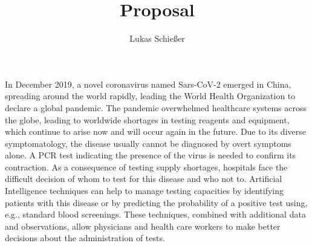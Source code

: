 \documentclass[12pt,a4paper,oneside]{article}
\title{Proposal}
\author{Lukas Schießer}
\date{}
\begin{document}
\maketitle
In December 2019, a novel coronavirus named Sars-CoV-2 emerged in China, spreading around the world rapidly, leading the World Health Organization to declare a global pandemic. The pandemic overwhelmed healthcare systems across the globe, leading to worldwide shortages in testing reagents and equipment, which continue to arise now and will occur again in the future. \cite{jaecklin_2020, asm.org_2020}
Due to its diverse symptomatology, the disease usually cannot be diagnosed by overt symptoms alone. A PCR test indicating the presence of the virus is needed to confirm its contraction.
As a consequence of testing supply shortages, hospitals face the difficult decision of whom to test for this disease and who not to.
Artificial Intelligence techniques can help to manage testing capacities by identifying patients with this disease or by predicting the probability of a positive test using, e.g., standard blood screenings. These techniques, combined with additional data and observations, allow physicians and health care workers to make better decisions about the administration of tests.
\par
\end{document}
